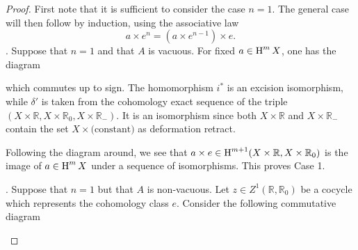 \documentclass[../main]{subfiles}
\begin{document}
\begin{proof}
First note that it is sufficient to consider the case $n=1$. The general case will then follow by induction, using the associative law \[a\times e^n = (a\times e^{n-1}) \times e.\]
. Suppose that $n=1$ and that $A$ is vacuous. For fixed $a\in \operatorname{H}^m X$, one has the diagram

\begin{center}
\end{center}


which commutes up to sign. The homomorphism $i^*$ is an excision isomorphism, while $\delta'$ is taken from the cohomology exact sequence of the triple\newline $(X\times \mathbb{R}, X\times \mathbb{R}_0, X\times \mathbb{R}_-)$. It is an isomorphism since both $X\times \mathbb{R}$ and $X\times \mathbb{R}_-$ contain the set $X\times \text{(constant)}$ as deformation retract.

Following the diagram around, we see that $a\times e\in \operatorname{H}^{m+1} (X\times \mathbb{R}, X\times \mathbb{R}_0)$ is the image of $a\in \operatorname{H}^m X$ under a sequence of isomorphisms. This proves Case 1.

. Suppose that $n=1$ but that $A$ is non-vacuous. Let $z\in Z^1 (\mathbb{R}, \mathbb{R}_0)$ be a cocycle which represents the cohomology class $e$. Consider the following commutative diagram

\begin{center}
\end{center}


\end{proof}
\end{document}
